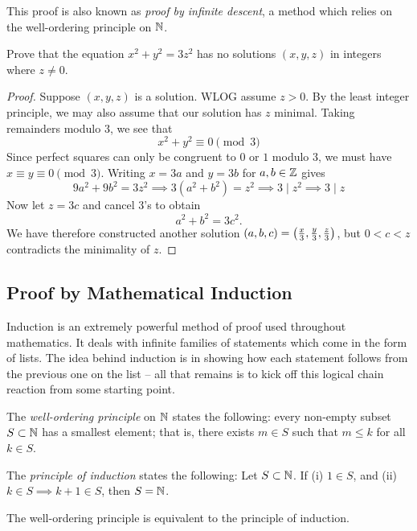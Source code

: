 \begin{remark}
This proof is also known as \emph{proof by infinite descent}, a method which relies on the well-ordering principle on $\mathbb N$.
\end{remark}

\begin{example}
Prove that the equation $x^2+y^2=3z^2$ has no solutions $(x,y,z)$ in integers where $z\neq0$.

\begin{proof}
Suppose $(x,y,z)$ is a solution. WLOG assume $z>0$. By the least integer principle, we may also assume that our solution has $z$ minimal. Taking remainders modulo $3$, we see that
\[ x^2+y^2\equiv0\pmod3 \]
Since perfect squares can only be congruent to $0$ or $1$ modulo $3$, we must have $x\equiv y\equiv 0\pmod 3$. Writing $x=3a$ and $y=3b$ for $a,b\in\mathbb Z$ gives
\[ 9a^2+9b^2=3z^2 \implies 3(a^2+b^2)=z^2 \implies 3\mid z^2 \implies 3\mid z \]
Now let $z=3c$ and cancel $3$'s to obtain
\[ a^2+b^2=3c^2. \]
We have therefore constructed another solution $(a,b,c)=\left(\frac{x}{3},\frac{y}{3},\frac{z}{3}\right)$, but $0<c<z$ contradicts the minimality of $z$.
\end{proof}
\end{example}
\pagebreak

\subsection{Proof by Mathematical Induction}
Induction is an extremely powerful method of proof used throughout mathematics. It deals with infinite families of statements which come in the form of lists. The idea behind induction is in showing how each statement follows from the previous one on the list -- all that remains is to kick off this logical chain reaction from some starting point.

The \emph{well-ordering principle} on $\mathbb N$ states the following: every non-empty subset $S\subset\mathbb N$ has a smallest element; that is, there exists $m\in S$ such that $m\le k$ for all $k\in S$.

The \emph{principle of induction} states the following: Let $S\subset\mathbb N$. If (i) $1\in S$, and (ii) $k\in S\implies k+1\in S$, then $S=\mathbb N$.

\begin{lemma}\label{lemma:wop-poi}
The well-ordering principle is equivalent to the principle of induction.
\end{lemma}

